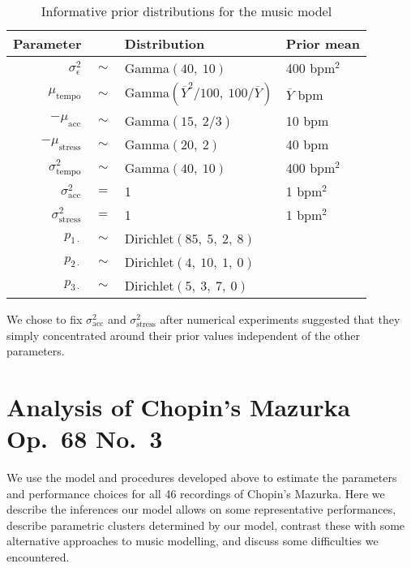 \documentclass[12pt]{article}
\begin{document}
\begin{table}[t]
  \centering
  \begin{tabular}{@{}rcll@{}}
    \toprule
    Parameter & \phantom{a} & Distribution & Prior mean\\
    \midrule
    $\sigma^2_{\epsilon}$ & $\sim$ & Gamma$(40,\ 10)$ & 400 bpm$^2$\\
    $\mu_{\textrm{tempo}}$ & $\sim$ & Gamma$(\overline{Y}^2/100,\ 100
                                      /\overline{Y})$ & $\overline{Y}$
                                                        bpm\\
    $-\mu_{\textrm{acc}} $ & $\sim$ & Gamma$(15,\ 2/3)$ & 10 bpm\\
    $-\mu_{\textrm{stress}} $ & $\sim$ & Gamma$(20,\ 2)$ & 40 bpm\\
    $\sigma^2_{\textrm{tempo}} $ & $\sim$ & Gamma$(40,\ 10)$ & 400
                                                               bpm$^2$\\
    $\sigma^2_{\textrm{acc}} $ & $=$ & 1 & 1 bpm$^2$\\
    $\sigma^2_{\textrm{stress}} $ & $=$ & 1 & 1 bpm$^2$\\
    $p_{1\cdot}$ & $\sim$ & Dirichlet$(85,\ 5,\ 2,\ 8)$ \\
    $p_{2\cdot}$ & $\sim$ & Dirichlet$(4,\ 10,\ 1,\ 0)$ \\
    $p_{3\cdot}$ & $\sim$ & Dirichlet$(5,\ 3,\ 7,\ 0)$ \\
    \bottomrule
  \end{tabular}
  \caption{Informative prior distributions for the music model}
  \label{tab:priors}
\end{table}
We chose to fix $\sigma^2_{\textrm{acc}}$ and
$\sigma^2_{\textrm{stress}}$ after numerical experiments suggested
that they simply concentrated around their prior values independent of
the other parameters.


\section{Analysis of Chopin's Mazurka Op.\ 68 No.\ 3}
\label{sec:analys-chop-mazurka}

We use the model and procedures developed above to estimate the
parameters and performance choices for all 46 recordings of Chopin's
Mazurka. Here we describe the inferences our model allows on some
representative performances, describe parametric clusters determined
by our model, contrast these with some alternative approaches to music
modelling, and discuss some difficulties we encountered.
\end{document}
